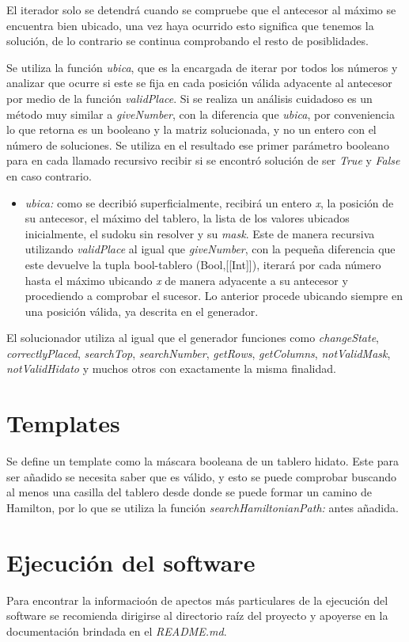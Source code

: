 \documentclass[10pt]{amsart}
\begin{document}
    El iterador solo se detendr\'a cuando se compruebe que el antecesor al m\'aximo se encuentra bien ubicado, una vez haya ocurrido esto significa que tenemos la soluci\'on, de lo contrario se continua comprobando el resto de posiblidades.
	   
    Se utiliza la funci\'on \textit{ubica}, que es la encargada de iterar por todos los n\'umeros y analizar que ocurre si este se fija en cada posici\'on v\'alida adyacente al antecesor por medio de la funci\'on \textit{validPlace}. Si se realiza un an\'alisis cuidadoso es un m\'etodo muy similar a \textit{giveNumber}, con la diferencia que \textit{ubica}, por conveniencia lo que retorna es un booleano y la matriz solucionada, y no un entero con el n\'umero de soluciones. Se utiliza en el resultado ese primer parámetro booleano para en cada llamado recursivo recibir si se encontró solución de ser \textit{True} y \textit{False} en caso contrario.	
   
   \begin{itemize}
        
        \item \textit{ubica:} como se decribi\'o superficialmente, recibir\'a un entero \textit{x}, la posici\'on de su antecesor, el m\'aximo del tablero, la lista de los valores ubicados inicialmente, el sudoku sin resolver y su \textit{mask}. Este de manera recursiva utilizando \textit{validPlace} al igual que \textit{giveNumber}, con la pequeña diferencia que este devuelve la tupla bool-tablero (Bool,[[Int]]), iterar\'a por cada n\'umero hasta el m\'aximo ubicando \textit{x} de manera adyacente a su antecesor y procediendo a comprobar el sucesor. Lo anterior procede ubicando siempre en una posici\'on v\'alida, ya descrita en el generador. 	
    
    \end{itemize}
    
     El solucionador utiliza al igual que el generador funciones como \textit{changeState}, \textit{correctlyPlaced}, \textit{searchTop}, \textit{searchNumber}, \textit{getRows}, \textit{getColumns}, \textit{notValidMask}, \textit{notValidHidato} y muchos otros con exactamente la misma finalidad. 

    \section*{Templates}
    Se define un template como la m\'ascara booleana de un tablero hidato. Este para ser a\~nadido se necesita saber que es v\'alido, y esto se puede comprobar buscando al menos una casilla del tablero desde donde se puede formar un camino de Hamilton, por lo que se utiliza la funci\'on \textit{searchHamiltonianPath:} antes a\~nadida.

    \section*{Ejecuci\'on del software}

    Para encontrar la informacio\'on de apectos m\'as particulares de la ejecuci\'on del software se recomienda dirigirse al directorio ra\'iz del proyecto y apoyerse en la documentaci\'on brindada en el \textit{README.md}.
     
\end{document}
